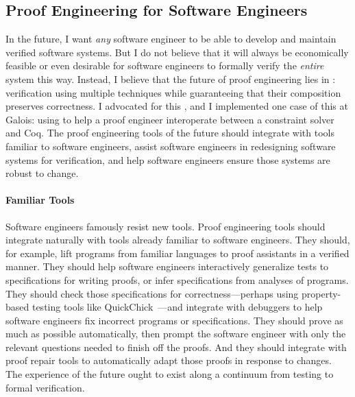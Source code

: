 \subsection*{Proof Engineering for Software Engineers}

In the future, I want \textit{any} software engineer to be able to develop and maintain verified software systems.
But I do not believe that it will always be economically feasible or even desirable for software engineers to formally verify 
the \textit{entire} system this way.
Instead, I believe that the future of proof engineering lies in :
verification using multiple techniques while guaranteeing that their composition preserves correctness.
I advocated for this , and I implemented one case of this at Galois: using
\sysnamelong to help a proof engineer interoperate between a constraint solver and Coq.
The proof engineering tools of the future should integrate with tools familiar to software engineers,
assist software engineers in redesigning software systems for verification,
and help software engineers ensure those systems are robust to change.

\paragraph{Familiar Tools}
Software engineers famously resist new tools.
Proof engineering tools should integrate naturally with tools already familiar to software engineers.
They should, for example, lift programs from familiar languages to proof assistants in a verified manner.
They should help software engineers interactively generalize tests to specifications for writing proofs,
or infer specifications from analyses of programs.
They should check those specifications for correctness---perhaps using property-based testing tools 
like QuickChick~\cite{Paraskevopoulou2015, lampropoulos2017generating}---and integrate with debuggers to help software engineers 
fix incorrect programs or specifications.
They should prove as much as possible automatically, then prompt the software engineer with only the relevant questions
needed to finish off the proofs.
And they should integrate with proof repair tools to automatically adapt those proofs in response to changes.
The experience of the future ought to exist along a continuum from testing to formal verification.

